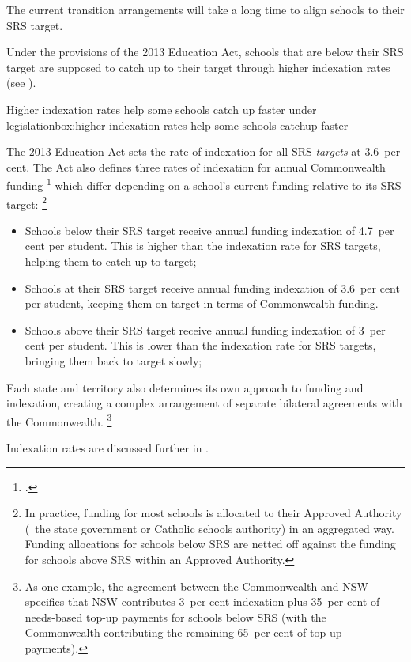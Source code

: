\documentclass{grattan}
\begin{document}
The current transition arrangements will take a long time to align schools to their SRS target.

Under the provisions of the 2013 Education Act, schools that are below their SRS target are supposed to catch up to their target through higher indexation rates (see ).

\begin{smallbox}{Higher indexation rates help some schools catch up faster under legislation}{box:higher-indexation-rates-help-some-schools-catchup-faster}

The 2013 Education Act sets the rate of indexation for all SRS \emph{targets} at 3.6~per cent.
The Act also defines three rates of indexation for annual Commonwealth funding%
\footcite{2013AustralianEducationAct} which differ depending on a school's current funding relative to its SRS target:%
\footnote{In practice, funding for most schools is allocated to their Approved Authority (\eg~the state government or Catholic schools authority) in an aggregated way.
Funding allocations for schools below SRS are netted off against the funding for schools above SRS within an Approved Authority.}

\begin{itemize}[leftmargin=1.0em]
\item Schools below their SRS target  receive annual funding indexation of 4.7~per cent per student.
This is higher than the indexation rate for SRS targets, helping them to catch up to target;
\item Schools at their SRS target  receive annual funding indexation of 3.6~per cent per student, keeping them on target in terms of Commonwealth funding.
\item Schools above their SRS target  receive annual funding indexation of 3~per cent per student.
This is lower than the indexation rate for SRS targets, bringing them back to target slowly;

\end{itemize}

Each state and territory also determines its own approach to funding and indexation, creating a complex arrangement of separate bilateral agreements with the Commonwealth.%
\footnote{As one example, the agreement between the Commonwealth and NSW specifies that NSW contributes 3~per cent indexation plus 35~per cent of needs-based top-up payments for schools below SRS (with the Commonwealth contributing the remaining 65~per cent of top up payments).}

Indexation rates are discussed further in .
\end{smallbox}
\end{document}
